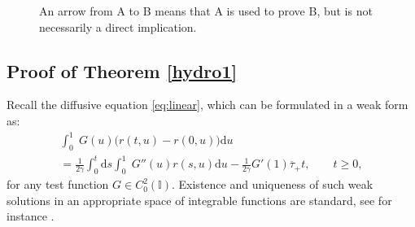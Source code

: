 \documentclass[EJP]{ejpecp} %
\newcommand\T{{\mathbb I}}
\renewcommand{\ge}{\geqslant}
\newcommand{\dd  }{\mathrm{d}}
\renewcommand{\bar}{\overline}
\numberwithin{equation}{section}
\begin{document}
\begin{center}
\begin{figure}[h!]
\caption{An arrow from A to B means that A is used to prove B, but is not necessarily a direct implication.}
\label{fig}
\end{figure}
\end{center}

\subsection{Proof of Theorem \ref{hydro1}}

\label{sec11.2.1}

Recall the diffusive equation \eqref{eq:linear}, which can be formulated in a weak form as:
\begin{multline}
  \label{eq:wlinear}
  \int_0^1 \; G(u) \big(r(t,u) - r(0,u)\big) \dd u \\ 
= \frac {1}{{2\gamma}} \int_0^t \dd s
  \int_0^1    \; G''(u) r(s,u) \dd u -  \frac {1}{{2\gamma}}  G'(1)
  \bar\tau_+ t
  ,\qquad t\ge 0,
\end{multline}
for any  test function $G\in C^2_{0}(\T)$. Existence and uniqueness of such weak solutions in an appropriate
space of integrable functions are standard, {see for instance \cite[Section 2.3]{strauss}}. 
\end{document}
